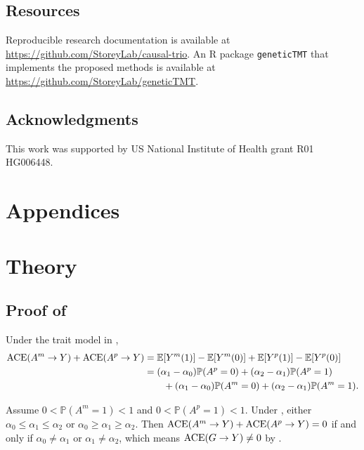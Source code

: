 \documentclass[12pt]{extarticle}
\newcommand{\pp}{\mathbb{P}}
\newcommand{\E}{\mathbb{E}}
\newcommand{\ace}{{\normalfont \text{ACE}}}
\begin{document}
{\subsection*{Resources}

Reproducible research documentation is available at \url{https://github.com/StoreyLab/causal-trio}. An R package \texttt{geneticTMT} that implements the proposed methods is available at \url{https://github.com/StoreyLab/geneticTMT}.

\subsection*{Acknowledgments}

This work was supported by US National Institute of Health grant R01 HG006448.

\clearpage
\printbibliography  {}

\clearpage

\appendix


\section*{Appendices} 
\section{Theory}

\subsection{Proof of } \label{app:gma}

Under the trait model in ,  
\begin{align*}
\ace (A^m \to Y) + \ace (A^p \to Y) &= \E[Y^m(1)]-\E[Y^m(0)] + \E[Y^p(1)]-\E[Y^p(0)]\nonumber \\
&= (\alpha_1-\alpha_0)\pp(A^p=0) + (\alpha_2-\alpha_1)\pp(A^p=1) ~ \nonumber \\
& \qquad + (\alpha_1-\alpha_0)\pp(A^m=0) + (\alpha_2-\alpha_1)\pp(A^m=1).
\end{align*}}Assume $0<\pp(A^m=1)<1$ and $0<\pp(A^p=1)<1$. Under , either $\alpha_0\leq \alpha_1 \leq \alpha_2$ or $\alpha_0\geq \alpha_1 \geq \alpha_2$. Then $\ace (A^m \to Y) + \ace (A^p \to Y)=0$ if and only if $\alpha_0\neq \alpha_1$ or $\alpha_1\neq \alpha_2$, which means $\ace(G\to Y) \neq 0$ by . 
\end{document}
